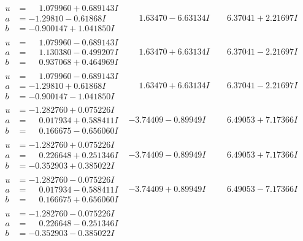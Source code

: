 \documentclass[1p]{elsarticle_modified}
\theoremstyle{definition}
\begin{document}
$$\begin{array}{c|c|c}
\begin{aligned}
u &= \phantom{-}1.079960 + 0.689143 I \\
a &= -1.29810 - 0.61868 I \\
b &= -0.900147 + 1.041850 I\end{aligned}
 & \phantom{-}1.63470 - 6.63134 I & \phantom{-}6.37041 + 2.21697 I \\ \hline\begin{aligned}
u &= \phantom{-}1.079960 - 0.689143 I \\
a &= \phantom{-}1.130380 - 0.499207 I \\
b &= \phantom{-}0.937068 + 0.464969 I\end{aligned}
 & \phantom{-}1.63470 + 6.63134 I & \phantom{-}6.37041 - 2.21697 I \\ \hline\begin{aligned}
u &= \phantom{-}1.079960 - 0.689143 I \\
a &= -1.29810 + 0.61868 I \\
b &= -0.900147 - 1.041850 I\end{aligned}
 & \phantom{-}1.63470 + 6.63134 I & \phantom{-}6.37041 - 2.21697 I \\ \hline\begin{aligned}
u &= -1.282760 + 0.075226 I \\
a &= \phantom{-}0.017934 + 0.588411 I \\
b &= \phantom{-}0.166675 - 0.656060 I\end{aligned}
 & -3.74409 - 0.89949 I & \phantom{-}6.49053 + 7.17366 I \\ \hline\begin{aligned}
u &= -1.282760 + 0.075226 I \\
a &= \phantom{-}0.226648 + 0.251346 I \\
b &= -0.352903 + 0.385022 I\end{aligned}
 & -3.74409 - 0.89949 I & \phantom{-}6.49053 + 7.17366 I \\ \hline\begin{aligned}
u &= -1.282760 - 0.075226 I \\
a &= \phantom{-}0.017934 - 0.588411 I \\
b &= \phantom{-}0.166675 + 0.656060 I\end{aligned}
 & -3.74409 + 0.89949 I & \phantom{-}6.49053 - 7.17366 I \\ \hline\begin{aligned}
u &= -1.282760 - 0.075226 I \\
a &= \phantom{-}0.226648 - 0.251346 I \\
b &= -0.352903 - 0.385022 I\end{aligned}

\end{array}$$
\end{document}
